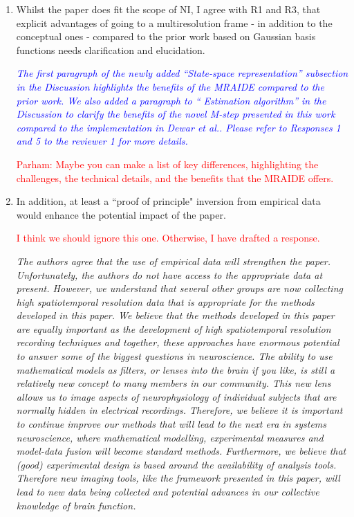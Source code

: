 \documentclass{article}
\newcommand{\dean}[1]{\textcolor{red}{#1}}
\newcommand{\parham}[1]{\textcolor{blue}{#1}}
\begin{document}
\begin{enumerate}
\item Whilst the paper does fit the scope of NI, I agree with R1 and R3, that explicit advantages of going to a multiresolution frame - in addition to the conceptual ones - compared to the prior work based on Gaussian basis functions needs clarification and elucidation.
 
\emph{\parham{The first paragraph of the newly added ``State-space representation'' subsection in the Discussion  highlights the benefits of the MRAIDE compared to the prior work. We also added a paragraph to `` Estimation algorithm'' in the Discussion to clarify the benefits of the novel M-step presented in this work compared to the implementation in Dewar et al.. Please refer to Responses 1 and 5 to the reviewer 1 for more details.}}


\dean{Parham: Maybe you can make a list of key differences, highlighting the challenges, the technical details, and the benefits that the MRAIDE offers.}

\item  In addition, at least a ``proof of principle" inversion from empirical data would enhance the potential impact of the paper. 

\dean{I think we should ignore this one. Otherwise, I have drafted a response.}


\emph{The authors agree that the use of empirical data will strengthen the paper. Unfortunately, the authors do not have access to the appropriate data at present. However, we understand that several other groups are now collecting high spatiotemporal resolution data that is appropriate for the methods developed in this paper. We believe that the methods developed in this paper are equally important as the development of high spatiotemporal resolution recording techniques and together, these approaches have enormous potential to answer some of the biggest questions in neuroscience. The ability to use mathematical models as filters, or lenses into the brain if you like, is still a relatively new concept to many members in our community. This new lens allows us to image aspects of neurophysiology of individual subjects that are normally hidden in electrical recordings. Therefore, we believe it is important to continue improve our methods that will lead to the next era in systems neuroscience, where mathematical modelling, experimental measures and model-data fusion will become standard methods. Furthermore, we believe that (good) experimental design is based around the availability of analysis tools. Therefore new imaging tools, like the framework presented in this paper, will lead to new data being collected and potential advances in our collective knowledge of brain function. } 
	
\end{enumerate}
\end{document}
